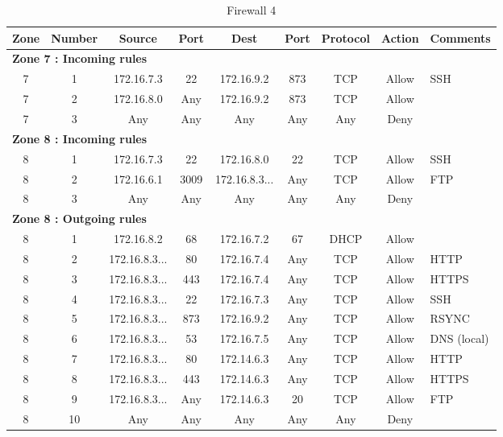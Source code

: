 \documentclass[a4paper,titlepage]{article}
\begin{document}
\begin{landscape}
	\vspace*{\fill}
	\begin{table}[h]
		\center
		\begin{tabular}{c|c|cc|cc|ccl}
			Zone & Number & Source & Port & Dest & Port & Protocol & Action & \multicolumn{1}{c}{Comments}\\
			\hline
			\multicolumn{9}{l}{\textbf{Zone 7 : Incoming rules}}\\
			7 & 1 & 172.16.7.3 & 22 & 172.16.9.2 & 873 & TCP & Allow & SSH\\
			7 & 2 & 172.16.8.0 & Any & 172.16.9.2 & 873 & TCP & Allow & \\
			7 & 3 & Any & Any & Any & Any & Any & Deny & \\

			\hline
			\multicolumn{9}{l}{\textbf{Zone 8 : Incoming rules}}\\
			8 & 1 & 172.16.7.3 & 22 & 172.16.8.0 & 22 & TCP & Allow & SSH \\
			8 & 2 & 172.16.6.1 & 3009 & 172.16.8.3... & Any & TCP & Allow & FTP \\
			8 & 3 & Any & Any & Any & Any & Any & Deny & \\
			\hline
			\multicolumn{9}{l}{\textbf{Zone 8 : Outgoing rules}}\\
			8 & 1 & 172.16.8.2 & 68 & 172.16.7.2 & 67 & DHCP & Allow & \\
			8 & 2 & 172.16.8.3... & 80 & 172.16.7.4 & Any & TCP & Allow & HTTP \\
			8 & 3 & 172.16.8.3... & 443 & 172.16.7.4 & Any & TCP & Allow & HTTPS \\
			8 & 4 & 172.16.8.3... & 22 & 172.16.7.3 & Any & TCP & Allow & SSH \\
			8 & 5 & 172.16.8.3... & 873 & 172.16.9.2 & Any & TCP & Allow & RSYNC \\
			8 & 6 & 172.16.8.3... & 53 & 172.16.7.5 & Any & TCP & Allow & DNS (local) \\
			8 & 7 & 172.16.8.3... & 80 & 172.14.6.3 & Any & TCP & Allow & HTTP \\
			8 & 8 & 172.16.8.3... & 443 & 172.14.6.3 & Any & TCP & Allow & HTTPS \\
			8 & 9 & 172.16.8.3... & Any & 172.14.6.3 & 20 & TCP & Allow & FTP \\
			8 & 10 & Any & Any & Any & Any & Any & Deny & \\
			\hline

		\end{tabular}
		\caption{Firewall 4}
	\end{table}
	\vspace*{\fill}
\end{landscape}
\end{document}
